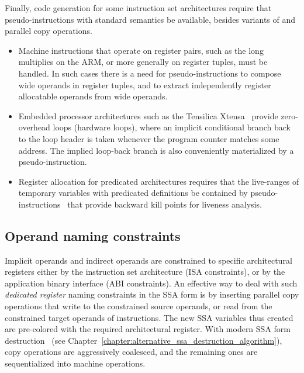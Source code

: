 Finally, code generation for some instruction set architectures require that
pseudo-instructions with standard semantics be available, besides variants of
\phifuns and parallel copy operations. \begin{itemize}

\item Machine instructions that operate on register pairs, such as the long
multiplies on the ARM, or more generally on register tuples, must be handled. In such
cases there is a need for pseudo-instructions to compose wide operands in
register tuples, and to extract independently register allocatable operands from
wide operands.

\item Embedded processor architectures such as the Tensilica Xtensa~\cite{Gonzalez:2000:IEEEMicro} provide zero-overhead loops (hardware
loops), where an implicit conditional branch back to the loop header is taken
whenever the program counter matches some address. The implied loop-back branch
is also conveniently materialized by a pseudo-instruction.

\item Register allocation for predicated architectures requires that the live-ranges
of temporary variables with predicated definitions be contained by
pseudo-instructions~\cite{Gillies:1996:MICRO} that provide backward kill points for liveness analysis.

\end{itemize}

\subsection{Operand naming constraints}

Implicit operands and indirect operands are constrained to specific
architectural registers either by the instruction set architecture (ISA
constraints), or by the application binary interface (ABI constraints). An
effective way to deal with such \emph{dedicated register} naming constraints in
the SSA form is by inserting parallel copy operations that write to the
constrained source operands, or read from the constrained target operands of
instructions. The new SSA variables thus created are pre-colored with the
required architectural register. With modern SSA form destruction~\cite{Sreedhar:1999:SAS,Boissinot:2009:CGO} (see Chapter~\ref{chapter:alternative_ssa_destruction_algorithm}), copy operations are aggressively
coalesced, and the remaining ones are sequentialized into machine operations.

